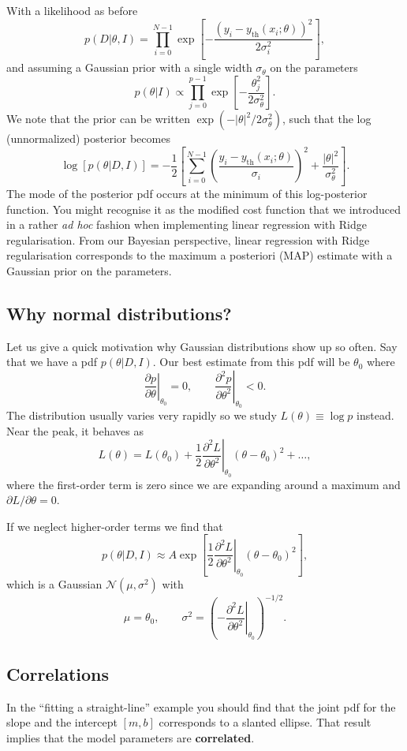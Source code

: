 \documentclass[%
oneside,                 %
final,                   %
10pt]{article}
\begin{document}
With a likelihood as before
\[
p(D|\theta,I) = \prod_{i=0}^{N-1} \exp \left[ -\frac{\left(y_i - y_\mathrm{th}(x_i;\theta) \right)^2}{2\sigma_i^2} \right],
\]
and assuming a Gaussian prior with a single width $\sigma_\theta$ on the parameters
\[
p(\theta|I) \propto \prod_{j=0}^{p-1} \exp \left[ -\frac{\theta_j^2}{2\sigma_\theta^2} \right].
\]
We note that the prior can be written $\exp\left( -|\theta|^2 / 2 \sigma_\theta^2\right)$, such that the log (unnormalized) posterior becomes
\[
\log \left[ p(\theta|D,I) \right] = -\frac{1}{2} \left[ \sum_{i=0}^{N-1} \left( \frac{ y_i - y_\mathrm{th}(x_i;\theta)}{\sigma_i}\right)^2 + \frac{|\theta|^2}{\sigma_\theta^2} \right].
\]
The mode of the posterior pdf occurs at the minimum of this log-posterior function. You might recognise it as the modified cost function that we introduced in a rather \emph{ad hoc} fashion when implementing linear regression with Ridge regularisation.  From our Bayesian perspective, linear regression with Ridge regularisation corresponds to the maximum a posteriori (MAP) estimate with a Gaussian prior on the parameters.


\subsection{Why normal distributions?}
Let us give a quick motivation why Gaussian distributions show up so often. Say that we have a pdf $p(\theta | D,I)$. Our best estimate from this pdf will be $\theta_0$ where
\[ 
\left. 
\frac{ \partial p }{ \partial \theta }
\right|_{\theta_0} = 0, \qquad
\left. \frac{ \partial^2 p }{ \partial \theta^2 }
\right|_{\theta_0} < 0.
\]
The distribution usually varies very rapidly so we study $L(\theta) \equiv \log p$ instead.
Near the peak, it behaves as
\[
L(\theta) = L(\theta_0) + \frac{1}{2} \left. \frac{\partial^2 L}{\partial \theta^2} \right|_{\theta_0} \left( \theta - \theta_0 \right)^2 + \ldots,
\]
where the first-order term is zero since we are expanding around a maximum and $\partial L / \partial\theta = 0$.

If we neglect higher-order terms we find that 
\[
p(\theta|D,I) \approx A \exp \left[ \frac{1}{2} \left. \frac{\partial^2 L}{\partial \theta^2} \right|_{\theta_0} \left( \theta - \theta_0 \right)^2  \right],
\]
which is a Gaussian $\mathcal{N}(\mu,\sigma^2)$ with
\[
\mu = \theta_0, \qquad \sigma^2 = \left( - \left. \frac{\partial^2 L}{\partial \theta^2} \right|_{\theta_0} \right)^{-1/2}.
\]

\subsection{Correlations}
In the ``fitting a straight-line'' example you should find that the joint pdf for the slope and the intercept $[m, b]$ corresponds to a slanted ellipse. That result implies that the model parameters are \textbf{correlated}.
\end{document}
